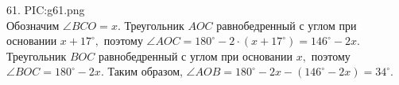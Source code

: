 61. {{PIC:g61.png}}\\
Обозначим $\angle BCO=x.$ Треугольник $AOC$ равнобедренный с углом при основании $x+17^\circ,$ поэтому $\angle AOC=180^\circ-2\cdot(x+17^\circ)=146^\circ-2x.$ Треугольник $BOC$ равнобедренный с углом при основании $x,$ поэтому $\angle BOC=180^\circ-2x.$ Таким образом, $\angle AOB=180^\circ-2x-(146^\circ-2x)=34^\circ.$\\
